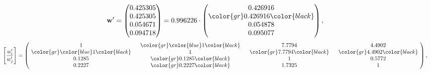 \begin{example}
\begin{equation*}
\mathbf{w}^{\prime} =
\begin{pmatrix}
0.425305\\
0.425305\\
0.054671\\
0.094718
\end{pmatrix} =
0.996226\cdot
\begin{pmatrix}
0.426916\\
\color{gr} 0.426916\color{black} \\
0.054878\\
0.095077
\end{pmatrix},
\end{equation*}
\begin{equation*}
\left[ \frac{{w}^{\prime}_i}{{w}^{\prime}_j} \right] =
\begin{pmatrix}
$\,\,$ 1 $\,\,$ & $\,\,$\color{gr} \color{blue} 1\color{black} $\,\,$ & $\,\,$7.7794$\,\,$ & $\,\,$4.4902$\,\,$ \\
$\,\,$\color{gr} \color{blue} 1\color{black} $\,\,$ & $\,\,$ 1 $\,\,$ & $\,\,$\color{gr} 7.7794\color{black} $\,\,$ & $\,\,$\color{gr} 4.4902\color{black}   $\,\,$ \\
$\,\,$0.1285$\,\,$ & $\,\,$\color{gr} 0.1285\color{black} $\,\,$ & $\,\,$ 1 $\,\,$ & $\,\,$0.5772 $\,\,$ \\
$\,\,$0.2227$\,\,$ & $\,\,$\color{gr} 0.2227\color{black} $\,\,$ & $\,\,$1.7325$\,\,$ & $\,\,$ 1  $\,\,$ \\
\end{pmatrix},
\end{equation*}
\end{example}
\newpage
